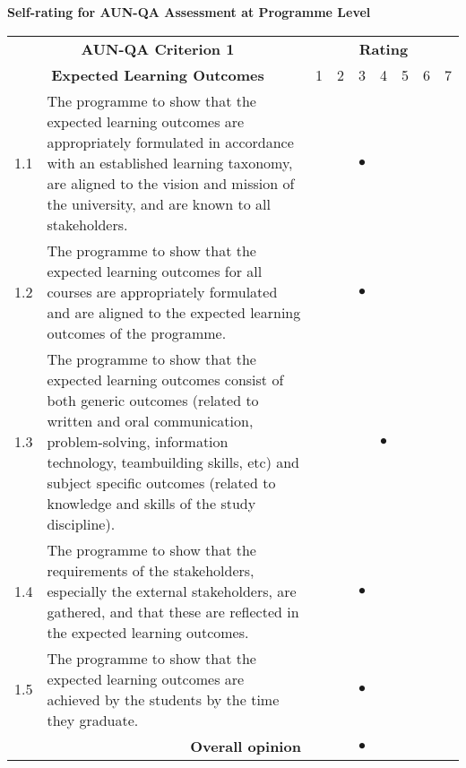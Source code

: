 \clearpage
\textbf{Self-rating for AUN-QA Assessment at Programme Level}
\begin{longtable}{|c| p{}|p{0.3cm}|p{0.3cm}|c|p{0.3cm}|p{0.3cm}|p{0.3cm}|p{0.3cm}|}
\hline
\multicolumn{2}{|c|}{\bf AUN-QA Criterion 1}&\multicolumn{7}{c|}{\bf Rating}\\\cline{3-9}
\multicolumn{2}{|c|}{\bf Expected Learning Outcomes}&1&2&3&4&5&6&7\\\hline
\endhead
1.1&The programme to show that the expected learning outcomes are appropriately formulated in accordance with an established learning taxonomy, are aligned to the vision and mission of the university, and are known to all stakeholders.&&& {\huge{$\bullet$}}&&&&\\\hline

1.2&The programme to show that the expected learning outcomes for all courses are appropriately formulated and are aligned to the expected learning outcomes of the programme.&&& {\huge{$\bullet$}}&&&&\\\hline 

1.3&The programme to show that the expected learning outcomes consist of both generic outcomes (related to written and oral communication, problem-solving, information technology, teambuilding skills, etc) and subject specific outcomes (related to knowledge and skills of the study discipline).&&&&{\huge{$\bullet$}}&&&\\\hline 

1.4&The programme to show that the requirements of the stakeholders, especially the external stakeholders, are gathered, and that these are reflected in the expected learning outcomes.&&& {\huge{$\bullet$}}&&&&\\\hline

1.5& The programme to show that the expected learning outcomes are achieved by the students by the time they graduate.&&& {\huge{$\bullet$}}&&&&\\\hline

\multicolumn{2}{|r|}{\bf Overall opinion}&&& {\huge{$\bullet$}}&&&&\\\hline
\end{longtable}


